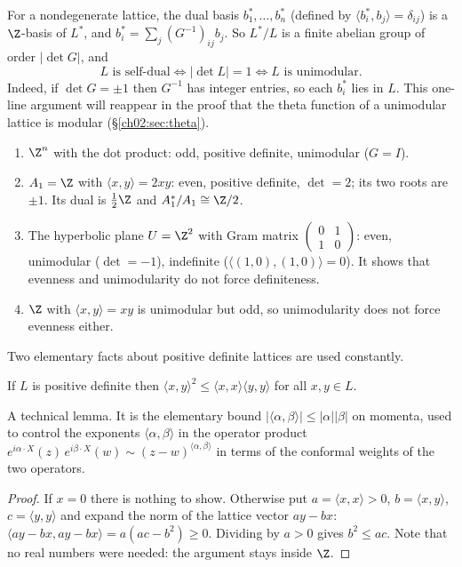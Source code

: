 For a nondegenerate lattice, the dual basis $b_1^*,\dots,b_n^*$ (defined by $\langle
b_i^*,b_j\rangle=\delta_{ij}$) is a $\Z$-basis of $L^*$, and $b_i^*=\sum_j (G^{-1})_{ij}b_j$.  So
$L^*/L$ is a finite abelian group of order $|\det G|$, and
\begin{equation}\label{ch02:eq:selfdual}
L \text{ is self-dual}\iff |\det L|=1 \iff L\text{ is unimodular}.
\end{equation}
Indeed, if $\det G=\pm1$ then $G^{-1}$ has integer entries, so each $b_i^*$ lies in $L$.  This
one-line argument will reappear in the proof that the theta function of a unimodular lattice is
modular (\S\ref{ch02:sec:theta}).

\begin{example}\label{ch02:ex:basic}
\begin{enumerate}
\item $\Z^n$ with the dot product: odd, positive definite, unimodular ($G=I$).
\item $A_1=\Z$ with $\langle x,y\rangle=2xy$: even, positive definite, $\det=2$; its two roots are
      $\pm1$.  Its dual is $\tfrac12\Z$ and $A_1^*/A_1\cong\Z/2$.
\item The hyperbolic plane $U=\Z^2$ with Gram matrix $\begin{pmatrix}0&1\\1&0\end{pmatrix}$:
      even, unimodular ($\det=-1$), indefinite ($\langle(1,0),(1,0)\rangle=0$).  It shows that
      evenness and unimodularity do not force definiteness.
\item $\Z$ with $\langle x,y\rangle=xy$ is unimodular but odd, so unimodularity does not force
      evenness either.
\end{enumerate}
\end{example}

Two elementary facts about positive definite lattices are used constantly.

\begin{lemma}\label{ch02:lem:cs}
If $L$ is positive definite then $\langle x,y\rangle^2\le\langle x,x\rangle\langle y,y\rangle$ for
all $x,y\in L$.
\end{lemma}
\begin{physics}
A technical lemma. It is the elementary bound $|\langle\alpha,\beta\rangle|\le|\alpha||\beta|$ on momenta, used to control the exponents $\langle\alpha,\beta\rangle$ in the operator product $e^{i\alpha\cdot X}(z)\,e^{i\beta\cdot X}(w)\sim(z-w)^{\langle\alpha,\beta\rangle}$ in terms of the conformal weights of the two operators.
\end{physics}
\begin{proof}
If $x=0$ there is nothing to show.  Otherwise put $a=\langle x,x\rangle>0$, $b=\langle x,y\rangle$,
$c=\langle y,y\rangle$ and expand the norm of the lattice vector $a y-b x$:
$\langle ay-bx,ay-bx\rangle=a(ac-b^2)\ge0$.  Dividing by $a>0$ gives $b^2\le ac$.  Note that no
real numbers were needed: the argument stays inside $\Z$.
\end{proof}

